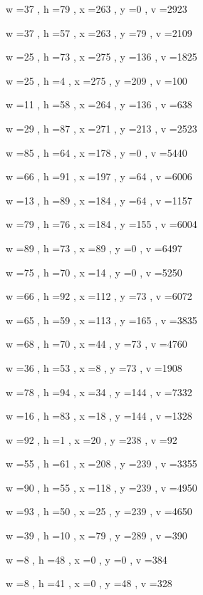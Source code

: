 \documentclass[11pt]{article}
\begin{document}
w =37 , h =79 , x =263 , y =0 , v =2923
\par
w =37 , h =57 , x =263 , y =79 , v =2109
\par
w =25 , h =73 , x =275 , y =136 , v =1825
\par
w =25 , h =4 , x =275 , y =209 , v =100
\par
w =11 , h =58 , x =264 , y =136 , v =638
\par
w =29 , h =87 , x =271 , y =213 , v =2523
\par
w =85 , h =64 , x =178 , y =0 , v =5440
\par
w =66 , h =91 , x =197 , y =64 , v =6006
\par
w =13 , h =89 , x =184 , y =64 , v =1157
\par
w =79 , h =76 , x =184 , y =155 , v =6004
\par
w =89 , h =73 , x =89 , y =0 , v =6497
\par
w =75 , h =70 , x =14 , y =0 , v =5250
\par
w =66 , h =92 , x =112 , y =73 , v =6072
\par
w =65 , h =59 , x =113 , y =165 , v =3835
\par
w =68 , h =70 , x =44 , y =73 , v =4760
\par
w =36 , h =53 , x =8 , y =73 , v =1908
\par
w =78 , h =94 , x =34 , y =144 , v =7332
\par
w =16 , h =83 , x =18 , y =144 , v =1328
\par
w =92 , h =1 , x =20 , y =238 , v =92
\par
w =55 , h =61 , x =208 , y =239 , v =3355
\par
w =90 , h =55 , x =118 , y =239 , v =4950
\par
w =93 , h =50 , x =25 , y =239 , v =4650
\par
w =39 , h =10 , x =79 , y =289 , v =390
\par
w =8 , h =48 , x =0 , y =0 , v =384
\par
w =8 , h =41 , x =0 , y =48 , v =328
\par
\newpage
\end{document}
